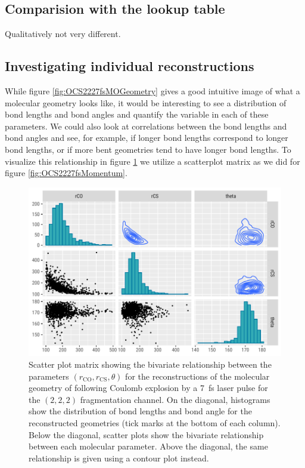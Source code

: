 \subsection{Comparision with the lookup table}
Qualitatively not very different.

\subsection{Investigating individual reconstructions}
While figure \ref{fig:OCS2227fsMOGeometry} gives a good intuitive image of what a molecular geometry looks like, it would be interesting to see a distribution of bond lengths and bond angles and quantify the variable in each of these parameters. We could also look at correlations between the bond lengths and bond angles and see, for example, if longer  bond lengths correspond to longer  bond lengths, or if more bent geometries tend to have longer bond lengths. To visualize this relationship in figure \ref{fig:OCS2227fsMOGeometryPairs} we utilize a scatterplot matrix as we did for figure \ref{fig:OCS2227fsMomentum}.

\begin{figure}
  \centering
  \includegraphics[width=\textwidth]{Plots/OCS2227fsMOGeometryPairs}
  \caption[Scatter plot matrix showing the bivariate relationship between the parameters $(r_\mathrm{CO}, r_\mathrm{CS}, \theta)$ for the reconstructions of the molecular geometry of  following Coulomb explosion by a \SI{7}{\fs} laser pulse for the $(2,2,2)$ fragmentation channel.]
  {Scatter plot matrix showing the bivariate relationship between the parameters $(r_\mathrm{CO}, r_\mathrm{CS}, \theta)$ for the reconstructions of the molecular geometry of  following Coulomb explosion by a \SI{7}{\fs} laser pulse for the $(2,2,2)$ fragmentation channel. On the diagonal, histograms show the distribution of bond lengths and bond angle for the reconstructed geometries (tick marks at the bottom of each column). Below the diagonal, scatter plots show the bivariate relationship between each molecular parameter. Above the diagonal, the same relationship is given using a contour plot instead.}
  \label{fig:OCS2227fsMOGeometryPairs}
\end{figure}

